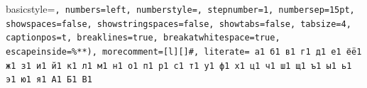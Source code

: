 \documentclass[a4paper,14pt]{extarticle} %
\newcommand{\0}{\varnothing}
\newcommand{\8}{\infty}
\theoremstyle{definition}
\begin{document}
\lstset
    { %
    basicstyle=\small\tt, %
    numbers=left, %
    numberstyle=\small, %
    stepnumber=1, %
    numbersep=15pt, %
    showspaces=false, %
    showstringspaces=false, %
    showtabs=false, %
    tabsize=4, %
    captionpos=t, %
    breaklines=true, %
    breakatwhitespace=true, %
    escapeinside={\%*}{*)}, %
    morecomment=[l][\color{gray}]{\#}, %
    literate=  %
        {а}{{\selectfont{}}}1 
        {б}{{\selectfont{}}}1
        {в}{{\selectfont{}}}1
        {г}{{\selectfont{}}}1
        {д}{{\selectfont{}}}1
        {е}{{\selectfont{}}}1
        {ё}{{\"e}}1
        {ж}{{\selectfont{}}}1
        {з}{{\selectfont{}}}1
        {и}{{\selectfont{}}}1
        {й}{{\selectfont{}}}1
        {к}{{\selectfont{}}}1
        {л}{{\selectfont{}}}1
        {м}{{\selectfont{}}}1
        {н}{{\selectfont{}}}1
        {о}{{\selectfont{}}}1
        {п}{{\selectfont{}}}1
        {р}{{\selectfont{}}}1
        {с}{{\selectfont{}}}1
        {т}{{\selectfont{}}}1
        {у}{{\selectfont{}}}1
        {ф}{{\selectfont{}}}1
        {х}{{\selectfont{}}}1
        {ц}{{\selectfont{}}}1
        {ч}{{\selectfont{}}}1
        {ш}{{\selectfont{}}}1
        {щ}{{\selectfont{}}}1
        {ъ}{{\selectfont{}}}1
        {ы}{{\selectfont{}}}1
        {ь}{{\selectfont{}}}1
        {э}{{\selectfont{}}}1
        {ю}{{\selectfont{}}}1
        {я}{{\selectfont{}}}1
        {А}{{\selectfont{}}}1
        {Б}{{\selectfont{}}}1
        {В}{{\selectfont{}}}1
}
\end{document}
